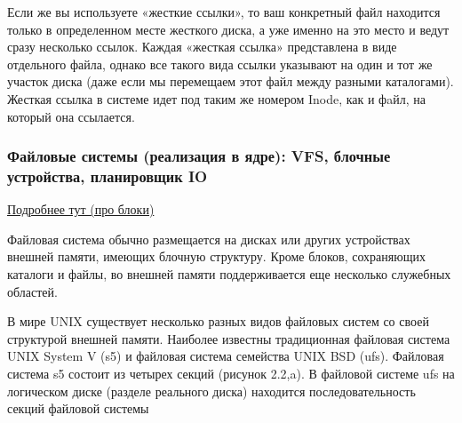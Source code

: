 \documentclass{article}
\begin{document}
Если же вы используете «жесткие ссылки», то ваш конкретный файл находится только в определенном месте жесткого диска, а уже именно на это место и ведут сразу несколько ссылок. Каждая «жесткая ссылка» представлена в виде отдельного файла, однако все такого вида ссылки указывают на один и тот же участок диска (даже если мы перемещаем этот файл между разными каталогами). Жесткая ссылка в системе идет под таким же номером Inode, как и фaйл, на который она ссылается.


\subsubsection{Файловые системы (реализация в ядре): VFS, блочные устройства, планировщик IO}

\href{https://docstore.mik.ua/unix2/glava_13.htm}{Подробнее тут (про блоки)}

Файловая система обычно размещается на дисках или других устройствах внешней памяти, имеющих блочную структуру. Кроме блоков, сохраняющих каталоги и файлы, во внешней памяти поддерживается еще несколько служебных областей. 

В мире UNIX существует несколько разных видов файловых систем со своей структурой внешней памяти. Наиболее известны традиционная файловая система UNIX System V (s5) и файловая система семейства UNIX BSD (ufs). Файловая система s5 состоит из четырех секций (рисунок 2.2,a). В файловой системе ufs на логическом диске (разделе реального диска) находится последовательность секций файловой системы 
\end{document}
